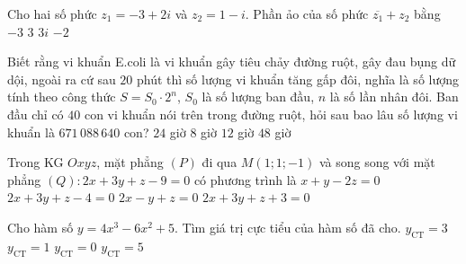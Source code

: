 \begin{ex}%
Cho hai số phức $z_1=-3+2i$ và $z_2=1-i$. Phần ảo của số phức $\overline{z_1}+z_2$ bằng	
	\choice
	{\True $-3$}
	{$3$}
	{$3i$}
	{$-2$}
\end{ex}

\begin{ex}%
Biết rằng vi khuẩn E.coli là vi khuẩn gây tiêu chảy đường ruột, gây đau bụng dữ dội, ngoài ra cứ sau $20$ phút thì số lượng vi khuẩn tăng gấp đôi, nghĩa là số lượng tính theo công thức $S=S_0\cdot 2^n$, $S_0$ là số lượng ban đầu, $n$ là số lần nhân đôi. Ban đầu chỉ có $40$ con vi khuẩn nói trên trong đường ruột, hỏi sau bao
lâu số lượng vi khuẩn là $671\,088\,640$ con?	
	\choice
	{$24$ giờ}
	{\True $8$ giờ}
	{$12$ giờ}
	{$48$ giờ}
\end{ex}

\begin{ex}%
	Trong KG $Oxyz$, mặt phẳng $(P) $ đi qua $M(1;1;-1)$ và song song với mặt phẳng $(Q)\colon 2x+3y+z-9=0$ có phương trình là
	\choice
	{$x+y-2z=0$}
	{\True $2x+3y+z-4=0$}
	{$2x-y+z=0$}
	{$2x+3y+z+3=0$}
\end{ex}

\begin{ex}%
	Cho hàm số $y=4x^3-6x^2+5$. Tìm giá trị cực tiểu của hàm số đã cho.
	\choice
	{\True $y_{\text{CT}}=3$}
	{$y_{\text{CT}}=1$}
	{$y_{\text{CT}}=0$}
	{$y_{\text{CT}}=5$}
\end{ex}


